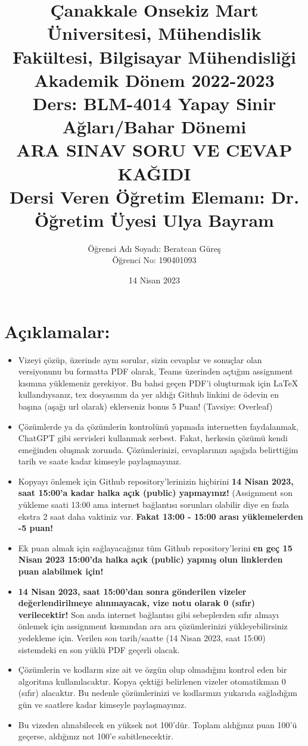 \documentclass[11pt]{article}
\title{Çanakkale Onsekiz Mart Üniversitesi, Mühendislik Fakültesi, Bilgisayar Mühendisliği Akademik Dönem 2022-2023\\
Ders: BLM-4014 Yapay Sinir Ağları/Bahar Dönemi\\ 
ARA SINAV SORU VE CEVAP KAĞIDI\\
Dersi Veren Öğretim Elemanı: Dr. Öğretim Üyesi Ulya Bayram}
\author{%
\begin{minipage}{\textwidth}
\raggedright
Öğrenci Adı Soyadı: Beratcan Güreş\\ %
Öğrenci No: 190401093
\end{minipage}%
}
\date{14 Nisan 2023}
\begin{document}
\maketitle

\vspace{-.5in}
\section*{Açıklamalar:}
\begin{itemize}
    \item Vizeyi çözüp, üzerinde aynı sorular, sizin cevaplar ve sonuçlar olan versiyonunu bu formatta PDF olarak, Teams üzerinden açtığım assignment kısmına yüklemeniz gerekiyor. Bu bahsi geçen PDF'i oluşturmak için LaTeX kullandıysanız, tex dosyasının da yer aldığı Github linkini de ödevin en başına (aşağı url olarak) eklerseniz bonus 5 Puan! (Tavsiye: Overleaf)
    \item Çözümlerde ya da çözümlerin kontrolünü yapmada internetten faydalanmak, ChatGPT gibi servisleri kullanmak serbest. Fakat, herkesin çözümü kendi emeğinden oluşmak zorunda. Çözümlerinizi, cevaplarınızı aşağıda belirttiğim tarih ve saate kadar kimseyle paylaşmayınız. 
    \item Kopyayı önlemek için Github repository'lerinizin hiçbirini \textbf{14 Nisan 2023, saat 15:00'a kadar halka açık (public) yapmayınız!} (Assignment son yükleme saati 13:00 ama internet bağlantısı sorunları olabilir diye en fazla ekstra 2 saat daha vaktiniz var. \textbf{Fakat 13:00 - 15:00 arası yüklemelerden -5 puan!}
    \item Ek puan almak için sağlayacağınız tüm Github repository'lerini \textbf{en geç 15 Nisan 2023 15:00'da halka açık (public) yapmış olun linklerden puan alabilmek için!}
    \item \textbf{14 Nisan 2023, saat 15:00'dan sonra gönderilen vizeler değerlendirilmeye alınmayacak, vize notu olarak 0 (sıfır) verilecektir!} Son anda internet bağlantısı gibi sebeplerden sıfır almayı önlemek için assignment kısmından ara ara çözümlerinizi yükleyebilirsiniz yedekleme için. Verilen son tarih/saatte (14 Nisan 2023, saat 15:00) sistemdeki en son yüklü PDF geçerli olacak.
    \item Çözümlerin ve kodların size ait ve özgün olup olmadığını kontrol eden bir algoritma kullanılacaktır. Kopya çektiği belirlenen vizeler otomatikman 0 (sıfır) alacaktır. Bu nedenle çözümlerinizi ve kodlarınızı yukarıda sağladığım gün ve saatlere kadar kimseyle paylaşmayınız.
    \item Bu vizeden alınabilecek en yüksek not 100'dür. Toplam aldığınız puan 100'ü geçerse, aldığınız not 100'e sabitlenecektir.

\end{itemize}
\end{document}
